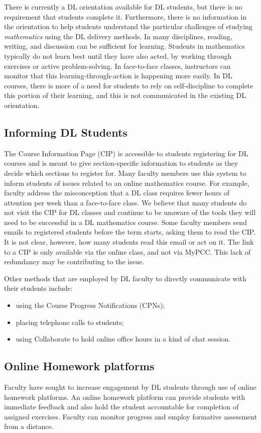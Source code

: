 There is currently a DL orientation available for DL students, but there is no
requirement that students complete it. Furthermore, there is no information in
the orientation to help students understand the particular challenges of
studying \emph{mathematics} using the DL delivery methods.  In many disciplines,
reading, writing, and discussion can be sufficient for learning. Students in
mathematics typically do not learn best until they have also acted, by working
through exercises or active problem-solving. In face-to-face classes,
instructors can monitor that this learning-through-action is happening more
easily. In DL courses, there is more of a need for students to rely on
self-discipline to complete this portion of their learning, and this is not
communicated in the existing DL orientation.


\subsection{Informing DL Students}
The Course Information Page (CIP) is accessible to students registering for DL
courses and is meant to give section-specific information to students as they
decide which sections to register for.   Many faculty members use this system to
inform students of issues related to an online mathematics course.  For example,
faculty address the misconception that a DL class requires fewer hours of
attention per week than a face-to-face class. We believe that many students do
not visit the CIP for DL classes and continue to be unaware of the tools they
will need to be successful in a DL mathematics course.   Some faculty members
send emails to registered students before the term starts, asking them to read
the CIP.  It is not clear, however, how many students read this email or act on
it.  The link to a CIP is only available via the online class, and not via
MyPCC. This lack of redundancy may be contributing to the issue.

Other methods that are employed by DL faculty to directly communicate with their
students include:
\begin{itemize}
\item using the Course Progress Notifications (CPNs);
\item placing telephone calls to students;
\item using Collaborate to hold online office hours in a kind of chat session.
\end{itemize}

\subsection{Online Homework platforms}
Faculty have sought to increase engagement by DL students through use of online
homework platforms. An online homework platform can provide students with
immediate feedback and also hold the student accountable for completion of
assigned exercises. Faculty can monitor progress and employ formative assessment
from a distance.

